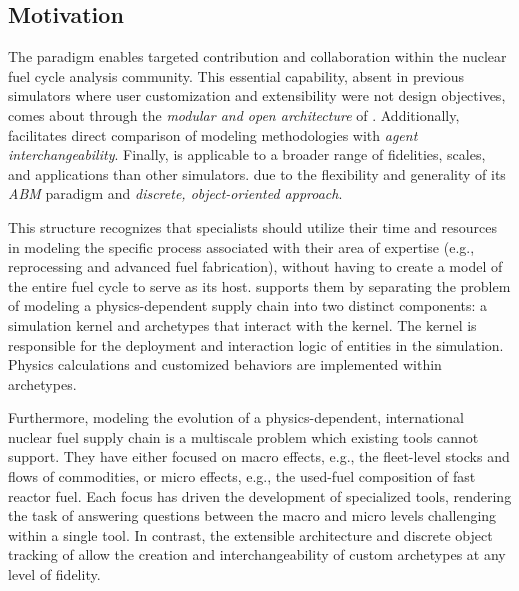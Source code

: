 \subsection{Motivation}

The \Cyclus paradigm enables targeted contribution and collaboration within the
nuclear fuel cycle analysis community. This essential capability, absent in
previous simulators where user customization and extensibility were not design
objectives, comes about through the \emph{modular and open architecture} of
\Cyclus.  Additionally, \Cyclus facilitates direct comparison of modeling
methodologies with \emph{agent interchangeability}.  Finally, \Cyclus is
applicable to a broader range of fidelities, scales, and applications than
other simulators.  due to the flexibility and generality of its
\emph{\gls{ABM}} paradigm and \emph{discrete, object-oriented approach}.

This structure recognizes that specialists should utilize their time and
resources in modeling the specific process associated with their area of
expertise (e.g., reprocessing and advanced fuel fabrication), without having to
create a model of the entire fuel cycle to serve as its host.  \Cyclus supports
them by separating the problem of modeling a physics-dependent supply chain
into two distinct components: a simulation kernel and archetypes that interact
with the kernel. The kernel is responsible for the deployment and interaction
logic of entities in the simulation.  Physics calculations and customized
behaviors are implemented within archetypes.

Furthermore, modeling the evolution of a physics-dependent, international
nuclear fuel supply chain is a multiscale problem which existing tools cannot
support. They have either focused on macro effects, e.g., the fleet-level
stocks and flows of commodities, or micro effects, e.g., the used-fuel
composition of fast reactor fuel. Each focus has driven the development of
specialized tools, rendering the task of answering questions between the macro
and micro levels challenging within a single tool.  In contrast, the extensible
architecture and discrete object tracking of \Cyclus allow the creation and
interchangeability of custom archetypes at any level of fidelity.
